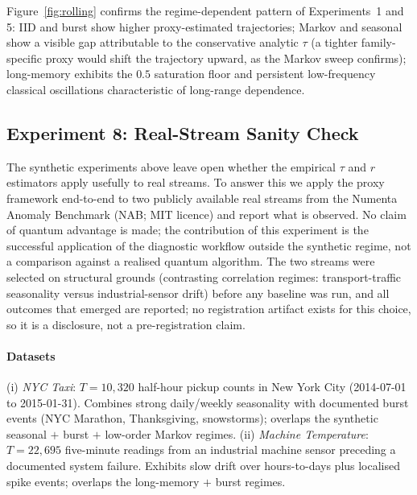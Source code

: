 \documentclass[sensors,article,submit,pdftex,moreauthors]{Definitions/mdpi}
\providecommand{\DIFadd}[1]{{\protect\color{blue}#1}} %
\providecommand{\DIFdel}[1]{} %
\providecommand{\DIFaddbegin}{} %
\providecommand{\DIFaddend}{} %
\providecommand{\DIFdelbegin}{} %
\providecommand{\DIFdelend}{} %
\begin{document}
Figure~\ref{fig:rolling} confirms the regime-dependent pattern of Experiments~1 and 5: IID and burst show higher proxy-estimated trajectories; Markov and seasonal show a visible gap attributable to the conservative analytic $\tau$ (a tighter family-specific proxy would shift the trajectory upward, as the Markov sweep confirms); long-memory exhibits the $0.5$ saturation floor and persistent low-frequency classical oscillations characteristic of long-range dependence.


\subsection{Experiment 8: Real-Stream Sanity Check}
\label{sec:real_stream}

The synthetic experiments above leave open whether the empirical $\tau$ and $r$ estimators apply usefully to real streams. To answer this we apply the proxy framework end-to-end to two publicly available real streams from the Numenta Anomaly Benchmark \citep{ahmad2017numenta} (NAB; MIT licence) and report what is observed. No claim of quantum advantage is made; the contribution of this experiment is the successful application of the diagnostic workflow outside the synthetic regime, not a comparison against a realised quantum algorithm. The two streams were \DIFdelbegin \DIFdel{chosen }\emph{\DIFdel{before}} %
\DIFdel{examining the results to span very different correlation regimes(}\DIFdelend \DIFaddbegin \DIFadd{selected on structural grounds (contrasting correlation regimes: }\DIFaddend transport-traffic seasonality versus industrial-sensor drift) \DIFdelbegin \DIFdel{, and we pre-committed to reporting whichever placement and baseline outcomes emerged}\DIFdelend \DIFaddbegin \DIFadd{before any baseline was run, and all outcomes that emerged are reported; no registration artifact exists for this choice, so it is a disclosure, not a pre-registration claim}\DIFaddend .

\paragraph{Datasets} (i) \emph{NYC Taxi}: $T = 10{,}320$ half-hour pickup counts in New York City (2014-07-01 to 2015-01-31). Combines strong daily/weekly seasonality with documented burst events (NYC Marathon, Thanksgiving, snowstorms); overlaps the synthetic seasonal $+$ burst $+$ low-order Markov regimes. (ii) \emph{Machine Temperature}: $T = 22{,}695$ five-minute readings from an industrial machine sensor preceding a documented system failure. Exhibits slow drift over hours-to-days plus localised spike events; overlaps the long-memory $+$ burst regimes.
\end{document}
